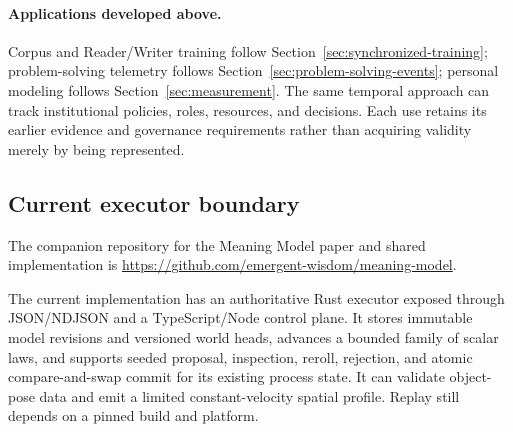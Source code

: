\documentclass[10pt]{article}
\begin{document}
\paragraph{Applications developed above.}
Corpus and Reader/Writer training follow Section~\ref{sec:synchronized-training};
problem-solving telemetry follows Section~\ref{sec:problem-solving-events};
personal modeling follows Section~\ref{sec:measurement}. The same temporal
approach can track institutional policies, roles, resources, and decisions.
Each use retains its earlier evidence and governance requirements rather than
acquiring validity merely by being represented.

\subsection{Current executor boundary}
\label{sec:executor}

The companion repository for the Meaning Model paper and shared implementation
is \url{https://github.com/emergent-wisdom/meaning-model}.

The current implementation has an authoritative Rust executor exposed through
JSON/NDJSON and a TypeScript/Node control plane. It stores immutable model
revisions and versioned world heads, advances a bounded family of scalar laws,
and supports seeded proposal, inspection, reroll, rejection, and atomic
compare-and-swap commit for its existing process state. It can validate
object-pose data and emit a limited constant-velocity spatial profile. Replay
still depends on a pinned build and platform.
\end{document}
